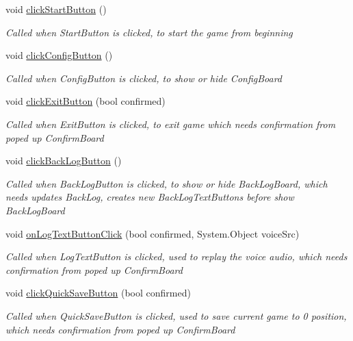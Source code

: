 \begin{DoxyCompactItemize}
void \hyperlink{class_world_control_a722399aefebc9b0a78e726e6de021376}{click\+Start\+Button} ()
\begin{DoxyCompactList}\small\item\em Called when Start\+Button is clicked, to start the game from beginning \end{DoxyCompactList}\item 
void \hyperlink{class_world_control_a17571acf0b8b2f71750c1903eccc0e72}{click\+Config\+Button} ()
\begin{DoxyCompactList}\small\item\em Called when Config\+Button is clicked, to show or hide Config\+Board \end{DoxyCompactList}\item 
void \hyperlink{class_world_control_aa1634636a07f080ce6d52a1c86320f54}{click\+Exit\+Button} (bool confirmed)
\begin{DoxyCompactList}\small\item\em Called when Exit\+Button is clicked, to exit game which needs confirmation from poped up Confirm\+Board \end{DoxyCompactList}\item 
void \hyperlink{class_world_control_a2636ddab0b0d16ccb407b7ae5be18d02}{click\+Back\+Log\+Button} ()
\begin{DoxyCompactList}\small\item\em Called when Back\+Log\+Button is clicked, to show or hide Back\+Log\+Board, which needs updates Back\+Log, creates new Back\+Log\+Text\+Buttons before show Back\+Log\+Board \end{DoxyCompactList}\item 
void \hyperlink{class_world_control_aa43a5ac856deb48676eb01a260e9c6aa}{on\+Log\+Text\+Button\+Click} (bool confirmed, System.\+Object voice\+Src)
\begin{DoxyCompactList}\small\item\em Called when Log\+Text\+Button is clicked, used to replay the voice audio, which needs confirmation from poped up Confirm\+Board \end{DoxyCompactList}\item 
void \hyperlink{class_world_control_a5d2f11fb2e6ec8d0691c4843666ea5e0}{click\+Quick\+Save\+Button} (bool confirmed)
\begin{DoxyCompactList}\small\item\em Called when Quick\+Save\+Button is clicked, used to save current game to 0 position, which needs confirmation from poped up Confirm\+Board \end{DoxyCompactList}\item 

\end{DoxyCompactItemize}
